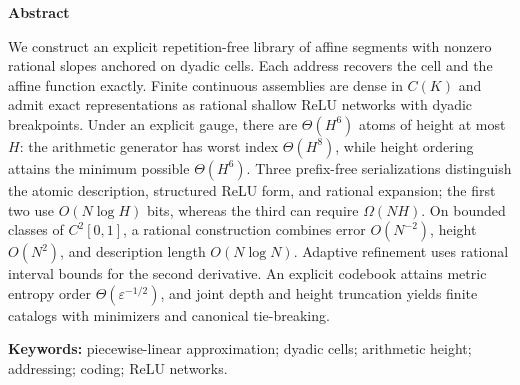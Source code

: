 \begin{abstract}
Construímos uma biblioteca enumerável, sem repetições, de segmentos afins de inclinação racional não nula ancorados em células diádicas. Cada endereço recupera exatamente a célula e a função afim. Montagens contínuas finitas são densas em $C(K)$ e admitem representação exata por redes ReLU rasas racionais com quebras diádicas. Sob um calibre explícito, há $\Theta(H^6)$ átomos de altura até $H$: o gerador aritmético tem pior índice $\Theta(H^8)$, e a enumeração por altura realiza o mínimo possível $\Theta(H^6)$. Três serializações prefix-free distinguem a descrição atômica, a forma ReLU estrutural e a expansão racional; as duas primeiras usam $O(N\log H)$ bits, enquanto a terceira pode exigir $\Omega(NH)$. Em classes limitadas de $C^2[0,1]$, uma construção racional reúne erro $O(N^{-2})$, altura $O(N^2)$ e descrição $O(N\log N)$. O refinamento adaptativo usa majorantes intervalares racionais da segunda derivada. A contagem de um codebook explícito realiza a ordem de entropia $\Theta(\varepsilon^{-1/2})$, e a truncagem conjunta de profundidade e altura fornece catálogos finitos com minimizadores e desempate canônico.

\smallskip\noindent\textbf{Palavras-chave:} aproximação linear por partes; células diádicas; altura aritmética; endereçamento; codificação; redes ReLU.
\end{abstract}

\begingroup\small
\begin{center}\textbf{Abstract}\end{center}
\noindent We construct an explicit repetition-free library of affine segments with nonzero rational slopes anchored on dyadic cells. Each address recovers the cell and the affine function exactly. Finite continuous assemblies are dense in $C(K)$ and admit exact representations as rational shallow ReLU networks with dyadic breakpoints. Under an explicit gauge, there are $\Theta(H^6)$ atoms of height at most $H$: the arithmetic generator has worst index $\Theta(H^8)$, while height ordering attains the minimum possible $\Theta(H^6)$. Three prefix-free serializations distinguish the atomic description, structured ReLU form, and rational expansion; the first two use $O(N\log H)$ bits, whereas the third can require $\Omega(NH)$. On bounded classes of $C^2[0,1]$, a rational construction combines error $O(N^{-2})$, height $O(N^2)$, and description length $O(N\log N)$. Adaptive refinement uses rational interval bounds for the second derivative. An explicit codebook attains metric entropy order $\Theta(\varepsilon^{-1/2})$, and joint depth and height truncation yields finite catalogs with minimizers and canonical tie-breaking.

\smallskip\noindent\textbf{Keywords:} piecewise-linear approximation; dyadic cells; arithmetic height; addressing; coding; ReLU networks.
\endgroup
